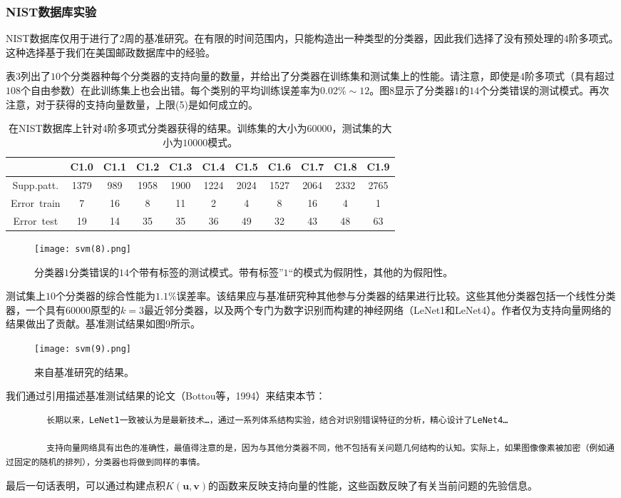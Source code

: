 \documentclass[lang=cn,11pt,a4paper]{elegantpaper}
\begin{document}
	\subsubsection{NIST数据库实验}
	NIST数据库仅用于进行了$2$周的基准研究。在有限的时间范围内，只能构造出一种类型的分类器，因此我们选择了没有预处理的$4$阶多项式。这种选择基于我们在美国邮政数据库中的经验。

	表3列出了$10$个分类器种每个分类器的支持向量的数量，并给出了分类器在训练集和测试集上的性能。请注意，即使是$4$阶多项式（具有超过$108$个自由参数）在此训练集上也会出错。每个类别的平均训练误差率为$0.02\%\sim12$。图8显示了分类器$1$的$14$个分类错误的测试模式。再次注意，对于获得的支持向量数量，上限(5)是如何成立的。

	\begin{table}[!htbp]
		\centering
		\caption{在NIST数据库上针对$4$阶多项式分类器获得的结果。训练集的大小为$60000$，测试集的大小为$10000$模式。}
		\begin{tabular}{ccccccccccc}
			\hline
			{} & {C1.0} & {C1.1} & {C1.2} & {C1.3} & {C1.4} & {C1.5} & {C1.6} & {C1.7} & {C1.8} &{C1.9} \\
			\hline
			{Supp.patt.} & 1379 & 989 & 1958 & 1900 & 1224 & 2024 & 1527 & 2064 & 2332 & 2765 \\
			{Error\ train} & 7 & 16 & 8 & 11 & 2 & 4 & 8 & 16 & 4 & 1 \\
			{Error\ test} & 19 & 14 & 35 & 35 & 36 & 49 & 32 & 43 & 48 & 63 \\
    		\hline
		\end{tabular}
	\end{table}
	\begin{figure}[htbp]
		\centering
		\texttt{[image: svm(8).png]}
		\caption{分类器$1$分类错误的$14$个带有标签的测试模式。带有标签”$1$“的模式为假阴性，其他的为假阳性。}
	\end{figure}
	测试集上$10$个分类器的综合性能为$1.1\%$误差率。该结果应与基准研究种其他参与分类器的结果进行比较。这些其他分类器包括一个线性分类器，一个具有$60000$原型的$k=3$最近邻分类器，以及两个专门为数字识别而构建的神经网络（LeNet1和LeNet4）。作者仅为支持向量网络的结果做出了贡献。基准测试结果如图9所示。
	\begin{figure}[htbp]
		\centering
		\texttt{[image: svm(9).png]}
		\caption{来自基准研究的结果。}
	\end{figure}
	我们通过引用描述基准测试结果的论文（Bottou等，1994）来结束本节：
	\begin{lstlisting}
		长期以来，LeNet1一致被认为是最新技术…，通过一系列体系结构实验，结合对识别错误特征的分析，精心设计了LeNet4…

		支持向量网络具有出色的准确性，最值得注意的是，因为与其他分类器不同，他不包括有关问题几何结构的认知。实际上，如果图像像素被加密（例如通过固定的随机的排列），分类器也将做到同样的事情。
	\end{lstlisting}
	最后一句话表明，可以通过构建点积$K(\mathbf{u},\mathbf{v})$的函数来反映支持向量的性能，这些函数反映了有关当前问题的先验信息。
\end{document}
